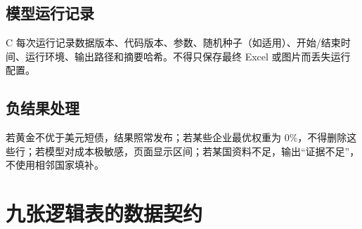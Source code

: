 \documentclass[UTF8,12pt,openany]{ctexbook}
\begin{document}
\section{模型运行记录}
C 每次运行记录数据版本、代码版本、参数、随机种子（如适用）、开始/结束时间、运行环境、输出路径和摘要哈希。不得只保存最终 Excel 或图片而丢失运行配置。

\section{负结果处理}
若黄金不优于美元短债，结果照常发布；若某些企业最优权重为 0\%，不得删除这些行；若模型对成本极敏感，页面显示区间；若某国资料不足，输出“证据不足”，不使用相邻国家填补。

\chapter{九张逻辑表的数据契约}
\end{document}
